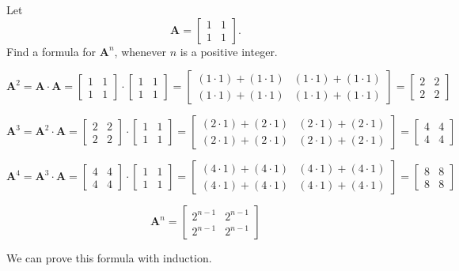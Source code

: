 
%
%
%

	Let
	$$\mathbf{A} = \begin{bmatrix} 1 & 1 \\ 1 & 1 \end{bmatrix}.$$
	Find a formula for $\mathbf{A}^n$,
	whenever $n$ is a positive integer.

\solution
	$$\mathbf{A}^2 = \mathbf{A} \cdot \mathbf{A}
	               = \begin{bmatrix} 1 & 1 \\ 1 & 1 \end{bmatrix}\cdot\begin{bmatrix} 1 & 1 \\ 1 & 1 \end{bmatrix}
	               = \begin{bmatrix} (1 \cdot 1) + (1 \cdot 1) & (1 \cdot 1) + (1 \cdot 1) \\ (1 \cdot 1) + (1 \cdot 1) & (1 \cdot 1) + (1 \cdot 1) \end{bmatrix}
	               = \begin{bmatrix} 2 & 2 \\ 2 & 2 \end{bmatrix}
	$$

	$$\mathbf{A}^3 = \mathbf{A}^2 \cdot \mathbf{A}
	               = \begin{bmatrix} 2 & 2 \\ 2 & 2 \end{bmatrix}\cdot\begin{bmatrix} 1 & 1 \\ 1 & 1 \end{bmatrix}
	               = \begin{bmatrix} (2 \cdot 1) + (2 \cdot 1) & (2 \cdot 1) + (2 \cdot 1) \\ (2 \cdot 1) + (2 \cdot 1) & (2 \cdot 1) + (2 \cdot 1) \end{bmatrix}
	               = \begin{bmatrix} 4 & 4 \\ 4 & 4 \end{bmatrix}
	$$

	$$\mathbf{A}^4 = \mathbf{A}^3 \cdot \mathbf{A}
	               = \begin{bmatrix} 4 & 4 \\ 4 & 4 \end{bmatrix}\cdot\begin{bmatrix} 1 & 1 \\ 1 & 1 \end{bmatrix}
	               = \begin{bmatrix} (4 \cdot 1) + (4 \cdot 1) & (4 \cdot 1) + (4 \cdot 1) \\ (4 \cdot 1) + (4 \cdot 1) & (4 \cdot 1) + (4 \cdot 1) \end{bmatrix}
	               = \begin{bmatrix} 8 & 8 \\ 8 & 8 \end{bmatrix}
	$$

	$$\mathbf{A}^n = \begin{bmatrix} 2^{n-1} & 2^{n-1} \\ 2^{n-1} & 2^{n-1} \end{bmatrix}
	$$

	We can prove this formula with induction.
